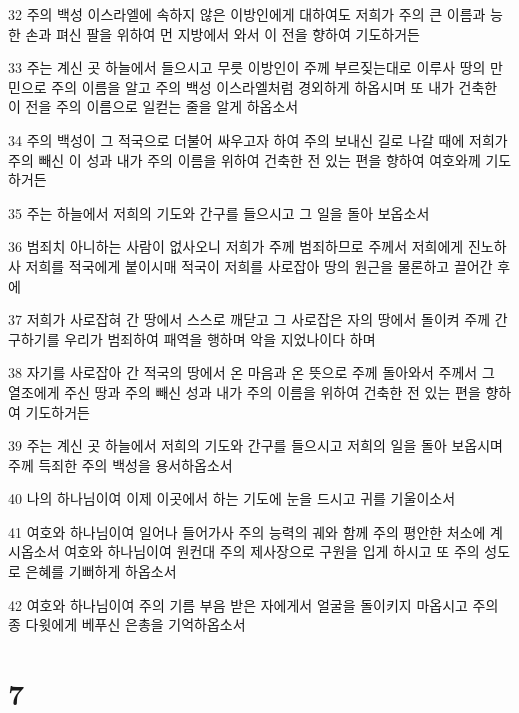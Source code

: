 \par 32 주의 백성 이스라엘에 속하지 않은 이방인에게 대하여도 저희가 주의 큰 이름과 능한 손과 펴신 팔을 위하여 먼 지방에서 와서 이 전을 향하여 기도하거든
\par 33 주는 계신 곳 하늘에서 들으시고 무릇 이방인이 주께 부르짖는대로 이루사 땅의 만민으로 주의 이름을 알고 주의 백성 이스라엘처럼 경외하게 하옵시며 또 내가 건축한 이 전을 주의 이름으로 일컫는 줄을 알게 하옵소서
\par 34 주의 백성이 그 적국으로 더불어 싸우고자 하여 주의 보내신 길로 나갈 때에 저희가 주의 빼신 이 성과 내가 주의 이름을 위하여 건축한 전 있는 편을 향하여 여호와께 기도하거든
\par 35 주는 하늘에서 저희의 기도와 간구를 들으시고 그 일을 돌아 보옵소서
\par 36 범죄치 아니하는 사람이 없사오니 저희가 주께 범죄하므로 주께서 저희에게 진노하사 저희를 적국에게 붙이시매 적국이 저희를 사로잡아 땅의 원근을 물론하고 끌어간 후에
\par 37 저희가 사로잡혀 간 땅에서 스스로 깨닫고 그 사로잡은 자의 땅에서 돌이켜 주께 간구하기를 우리가 범죄하여 패역을 행하며 악을 지었나이다 하며
\par 38 자기를 사로잡아 간 적국의 땅에서 온 마음과 온 뜻으로 주께 돌아와서 주께서 그 열조에게 주신 땅과 주의 빼신 성과 내가 주의 이름을 위하여 건축한 전 있는 편을 향하여 기도하거든
\par 39 주는 계신 곳 하늘에서 저희의 기도와 간구를 들으시고 저희의 일을 돌아 보옵시며 주께 득죄한 주의 백성을 용서하옵소서
\par 40 나의 하나님이여 이제 이곳에서 하는 기도에 눈을 드시고 귀를 기울이소서
\par 41 여호와 하나님이여 일어나 들어가사 주의 능력의 궤와 함께 주의 평안한 처소에 계시옵소서 여호와 하나님이여 원컨대 주의 제사장으로 구원을 입게 하시고 또 주의 성도로 은혜를 기뻐하게 하옵소서
\par 42 여호와 하나님이여 주의 기름 부음 받은 자에게서 얼굴을 돌이키지 마옵시고 주의 종 다윗에게 베푸신 은총을 기억하옵소서

\chapter{7}

